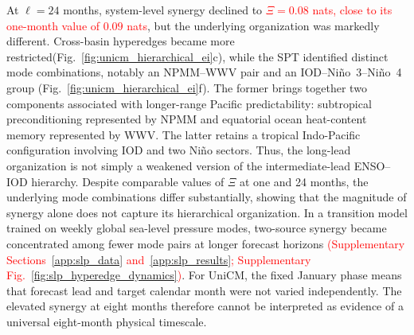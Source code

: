 \documentclass[fleqn,10pt]{wlscirep}
\newcommand{\rev}[1]{\textcolor{red}{#1}}
\theoremstyle{naturetheorem}
\begin{document}
At $\ell=24$ months, system-level synergy declined to %
\rev{$\Xi=0.08$ nats, close to its one-month value of $0.09$ nats}, but the underlying organization was markedly different. Cross-basin hyperedges became more restricted(Fig.~\ref{fig:unicm_hierarchical_ei}c), while the SPT identified distinct mode combinations, notably an NPMM--WWV pair and an IOD--Ni\~no~3--Ni\~no~4 group (Fig.~\ref{fig:unicm_hierarchical_ei}f). The former brings together two components associated with longer-range Pacific predictability: subtropical preconditioning represented by NPMM and equatorial ocean heat-content memory represented by WWV. The latter retains a tropical Indo-Pacific configuration involving IOD and two Ni\~no sectors. Thus, the long-lead organization is not simply a weakened version of the intermediate-lead ENSO--IOD hierarchy. Despite comparable values of $\Xi$ at one and 24 months, the underlying mode combinations differ substantially, showing that the magnitude of synergy alone does not capture its hierarchical organization. In a transition model trained on weekly global sea-level pressure modes, two-source synergy became concentrated among fewer mode pairs at longer forecast horizons %
\rev{(Supplementary Sections~\ref{app:slp_data} and~\ref{app:slp_results}; Supplementary Fig.~\ref{fig:slp_hyperedge_dynamics})}. For UniCM, the fixed January phase means that forecast lead and target calendar month were not varied independently. The elevated synergy at eight months therefore cannot be interpreted as evidence of a universal eight-month physical timescale.

\end{document}
